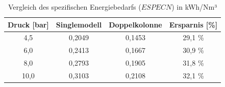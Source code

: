 \begin{table}[htbp]
\centering
\caption{Vergleich des spezifischen Energiebedarfs ($ESPECN$) in kWh/Nm³}
\label{tab:vergleich_power_penalty}
\begin{tabular}{cccc}
\hline
\textbf{Druck [bar]} & \textbf{Singlemodell} & \textbf{Doppelkolonne} & \textbf{Ersparnis [\%]} \\ \hline
4,5  & 0,2049 & 0,1453 & 29,1 \% \\
6,0  & 0,2413 & 0,1667 & 30,9 \% \\
8,0  & 0,2793 & 0,1905 & 31,8 \% \\
10,0 & 0,3103 & 0,2108 & 32,1 \% \\ \hline
\end{tabular}
\end{table}